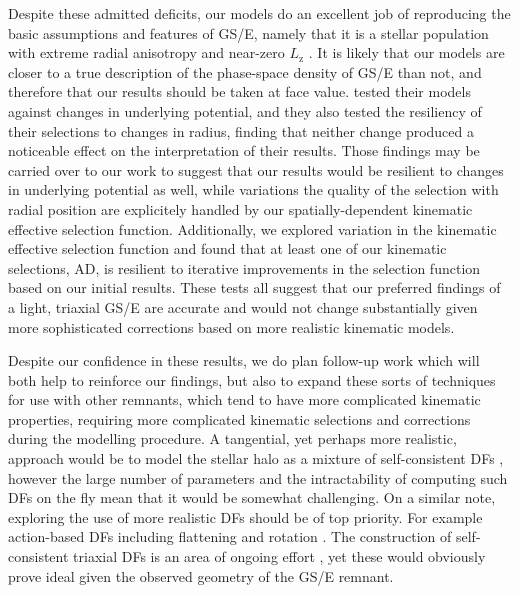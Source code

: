 Despite these admitted deficits, our models do an excellent job of reproducing the basic assumptions and features of GS/E, namely that it is a stellar population with extreme radial anisotropy and near-zero $L_\mathrm{z}$ \parencite[see figure 4 in][for example]{lane22}. It is likely that our models are closer to a true description of the phase-space density of GS/E than not, and therefore that our results should be taken at face value. \cite{lane22} tested their models against changes in underlying potential, and they also tested the resiliency of their selections to changes in radius, finding that neither change produced a noticeable effect on the interpretation of their results. Those findings may be carried over to our work to suggest that our results would be resilient to changes in underlying potential as well, while variations the quality of the selection with radial position are explicitely handled by our spatially-dependent kinematic effective selection function. Additionally, we explored variation in the kinematic effective selection function and found that at least one of our kinematic selections, AD, is resilient to iterative improvements in the selection function based on our initial results. These tests all suggest that our preferred findings of a light, triaxial GS/E are accurate and would not change substantially given more sophisticated corrections based on more realistic kinematic models.

Despite our confidence in these results, we do plan follow-up work which will both help to reinforce our findings, but also to expand these sorts of techniques for use with other remnants, which tend to have more complicated kinematic properties, requiring more complicated kinematic selections and corrections during the modelling procedure. A tangential, yet perhaps more realistic, approach would be to model the stellar halo as a mixture of self-consistent DFs \parencite[see, e.g.][for similar studies using Gaussian mixtures]{lancaster19,iorio21}, however the large number of parameters and the intractability of computing such DFs on the fly mean that it would be somewhat challenging. On a similar note, exploring the use of more realistic DFs should be of top priority. For example action-based DFs \parencite{binney14d,posti15,williams15} including flattening and rotation \parencite{binney14d}. The construction of self-consistent triaxial DFs is an area of ongoing effort \parencite{sanders15a,binney18}, yet these would obviously prove ideal given the observed geometry of the GS/E remnant.


